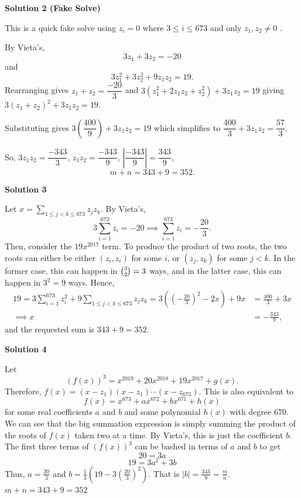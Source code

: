 \begin{enumerate}
\textbf{Solution 2 (Fake Solve)}

This is a quick fake solve using $z_i = 0$ where $3 \le i \le 673$ and only $z_1,z_2 \neq 0$ .

 By Vieta's, 
 \[3z_1+3z_2=-20\] and 
 \[3z_1^2+3z_2^2+9z_1z_2 = 19.\]Rearranging gives $z_1 + z_2 = \dfrac{-20}{3}$ and $3(z_1^2 + 2z_1z_2 + z_2^2) + 3z_1z_2 = 19$ giving $3(z_1 + z_2)^2 + 3z_1z_2 = 19$.

 Substituting gives $3\left(\dfrac{400}{9}\right) + 3z_1z_2 = 19$ which simplifies to $\dfrac{400}{3} + 3z_1z_2 = \dfrac{57}{3}$.

 So, $3z_1z_2 = \dfrac{-343}{3}$, $z_1z_2 = \dfrac{-343}{9}$, $|\dfrac{-343}{9}|=\dfrac{343}{9}$, 
 \[m+n = 343+9 = \boxed{352}.\]




\textbf{Solution 3}

Let $x=\sum_{1\le j<k\le 673} z_jz_k$. By Vieta's, 
 \[3\sum_{i=1}^{673}z_i=-20\implies \sum_{i=1}^{673}z_i=-\frac{20}3.\]Then, consider the $19x^{2017}$ term. To produce the product of two roots, the two roots can either be either $(z_i,z_i)$ for some $i$, or $(z_j,z_k)$ for some $j<k$. In the former case, this can happen in $\tbinom 32=3$ ways, and in the latter case, this can happen in $3^2=9$ ways. Hence,
 \begin{align*} 19=3\sum_{i=1}^{673} z_i^2+9\sum_{1\le j<k\le 673} z_jz_k=3\left(\left(-\frac{20}3\right)^2-2x\right)+9x&=\frac{400}3+3x\\ \implies x&=-\frac{343}9, \end{align*}
and the requested sum is $343+9=\boxed{352}$.

 



\textbf{Solution 4}

Let 
 \[(f(x))^3=x^{2019}+20x^{2018}+19x^{2017}+g(x).\] Therefore, $f(x)=(x-z_{1})(x-z_{1})\cdots (x-z_{673})$. This is also equivalent to 
 \[f(x)=x^{673}+ax^{672}+bx^{671}+h(x)\] for some real coefficients $a$ and $b$ and some polynomial $h(x)$ with degree $670$. We can see that the big summation expression is simply summing the product of the roots of $f(x)$ taken two at a time. By Vieta's, this is just the coefficient $b$. The first three terms of $(f(x))^3$ can be bashed in terms of $a$ and $b$ to get 
 \[20 = 3a\]
 \[19 = 3a^2+3b\]Thus, $a=\frac{20}{3}$ and $b=\frac{1}{3}\left(19-3\left(\frac{20}{3} \right)^2 \right)$. That is $|b|=\frac{343}{9}=\frac{m}{n}$. $m+n=343+9=\boxed{352}$





\end{enumerate}
